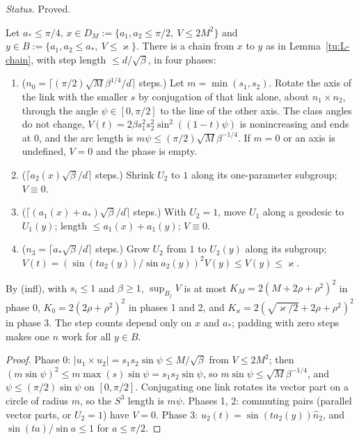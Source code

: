 \noindent\emph{Status.} Proved.

\begin{lemma}\label{tu:L-geom}
Let $a_*\le\pi/4$, $x\in D_M:=\{a_1,a_2\le\pi/2,\ V\le2M^2\}$ and $y\in B:=\{a_1,a_2\le a_*,\ V\le\varkappa\}$. There is a
chain from $x$ to $y$ as in Lemma~\ref{tu:L-chain}, with step length $\le d/\sqrt\beta$, in four phases:
\begin{enumerate}
\item[0.] ($n_0=\lceil(\pi/2)\sqrt M\beta^{1/4}/d\rceil$ steps.) Let $m=\min(s_1,s_2)$. Rotate the axis of the link with the smaller
$s$ by conjugation of that link alone, about $n_1\times n_2$, through the angle $\psi\in[0,\pi/2]$ to the line of the other axis.
The class angles do not change, $V(t)=2\beta s_1^2s_2^2\sin^2((1-t)\psi)$ is nonincreasing and ends at $0$, and the arc length is
$m\psi\le(\pi/2)\sqrt M\beta^{-1/4}$. If $m=0$ or an axis is undefined, $V=0$ and the phase is empty.
\item[1.] ($\lceil a_2(x)\sqrt\beta/d\rceil$ steps.) Shrink $U_2$ to $1$ along its one-parameter subgroup; $V\equiv0$.
\item[2.] ($\lceil(a_1(x)+a_*)\sqrt\beta/d\rceil$ steps.) With $U_2=1$, move $U_1$ along a geodesic to $U_1(y)$; length
$\le a_1(x)+a_1(y)$; $V\equiv0$.
\item[3.] ($n_3=\lceil a_*\sqrt\beta/d\rceil$ steps.) Grow $U_2$ from $1$ to $U_2(y)$ along its subgroup;
$V(t)=(\sin(ta_2(y))/\sin a_2(y))^2V(y)\le V(y)\le\varkappa$.
\end{enumerate}
By (infl), with $s_i\le1$ and $\beta\ge1$, $\sup_{B_j}V$ is at most $K_M=2(M+2\rho+\rho^2)^2$ in phase 0,
$K_0=2(2\rho+\rho^2)^2$ in phases 1 and 2, and $K_\varkappa=2(\sqrt{\varkappa/2}+2\rho+\rho^2)^2$ in phase 3. The step counts
depend only on $x$ and $a_*$; padding with zero steps makes one $n$ work for all $y\in B$.
\end{lemma}

\begin{proof}
Phase 0: $|u_1\times u_2|=s_1s_2\sin\psi\le M/\sqrt\beta$ from $V\le2M^2$; then $(m\sin\psi)^2\le m\max(s)\sin\psi=s_1s_2\sin\psi$,
so $m\sin\psi\le\sqrt M\beta^{-1/4}$, and $\psi\le(\pi/2)\sin\psi$ on $[0,\pi/2]$. Conjugating one link rotates its vector part
on a circle of radius $m$, so the $S^3$ length is $m\psi$. Phases 1, 2: commuting pairs (parallel vector parts, or $U_2=1$) have
$V=0$. Phase 3: $u_2(t)=\sin(ta_2(y))\hat n_2$, and $\sin(ta)/\sin a\le1$ for $a\le\pi/2$.
\end{proof}

